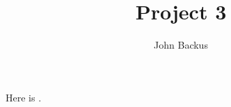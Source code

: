 \documentclass{article}
\title{Project 3}
\author{John Backus}
\begin{document}
\maketitle




Here is \extra{}.


\end{document}
